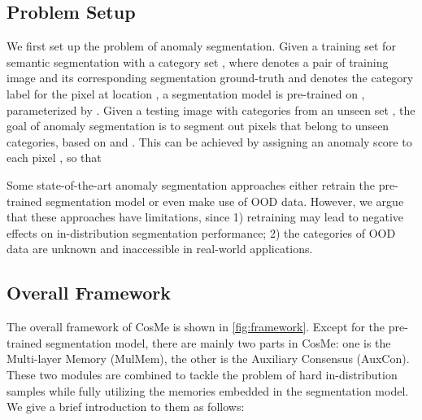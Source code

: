 \documentclass[10pt,twocolumn,letterpaper]{article}
\begin{document}
\subsection{Problem Setup}
\label{sec:setting}
We first set up the problem of anomaly segmentation.
Given a training set  for semantic segmentation with a category set , where  denotes a pair of training image and its corresponding segmentation ground-truth and  denotes the category label for the pixel at location , a segmentation model  is pre-trained on , parameterized by . Given a testing image  with categories from an unseen set , the goal of anomaly segmentation is to segment out pixels that belong to unseen categories, based on  and . This can be achieved by assigning an anomaly score  to each pixel , so that

\vspace{-6mm}







Some state-of-the-art anomaly segmentation approaches either retrain the pre-trained segmentation model or even make use of OOD data. However, we argue that these approaches have limitations, since 1) retraining may lead to negative effects on in-distribution segmentation performance; 2) the categories of OOD data are unknown and inaccessible in real-world applications.





\subsection{Overall Framework}
\label{sec:framework}
The overall framework of CosMe is shown in \cref{fig:framework}.
Except for the pre-trained segmentation model, there are mainly two parts in CosMe: one is the Multi-layer Memory (MulMem), the other is the Auxiliary Consensus (AuxCon). These two modules are combined to tackle the problem of hard in-distribution samples while fully utilizing the memories embedded in the segmentation model. We give a brief introduction to them as follows:
\end{document}
